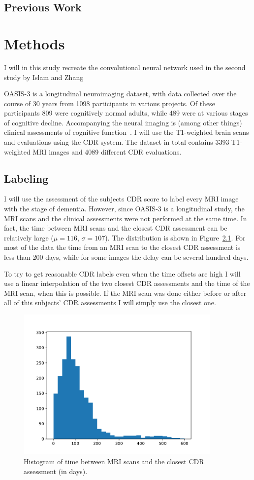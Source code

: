\documentclass{kththesis}
\begin{document}
\section{Previous Work}

\chapter{Methods}

I will in this study recreate the convolutional neural network used in the second study by Islam and Zhang

OASIS-3 is a longitudinal neuroimaging dataset, with data collected over the course of 30 years from 1098 participants in various projects. Of these participants 809 were cognitively normal adults, while 489 were at various stages of cognitive decline. Accompanying the neural imaging is (among other things) clinical assessments of cognitive function~\cite{oasis3}. I will use the T1-weighted brain scans and evaluations using the CDR system. The dataset in total contains 3393 T1-weighted MRI images and 4089 different CDR evaluations.

\section{Labeling}
I will use the assessment of the subjects CDR score to label every MRI image with the stage of dementia. However, since OASIS-3 is a longitudinal study, the MRI scans and the clinical assessments were not performed at the same time. In fact, the time between MRI scans and the closest CDR assessment can be relatively large ($\mu=116$, $\sigma=107$). The distribution is shown in Figure~\ref{fig:mri_cdr_offset}. For most of the data the time from an MRI scan to the closest CDR assessment is less than 200 days, while for some images the delay can be several hundred days.

To try to get reasonable CDR labels even when the time offsets are high I will use a linear interpolation of the two closest CDR assessments and the time of the MRI scan, when this is possible. If the MRI scan was done either before or after all of this subjects' CDR assessments I will simply use the closest one.

\begin{figure}
  \includegraphics[width=100mm]{img/mri_cdr_offset.pdf}
  \caption{Histogram of time between MRI scans and the closest CDR assessment (in days).}
  \label{fig:mri_cdr_offset}
\end{figure}
\end{document}

